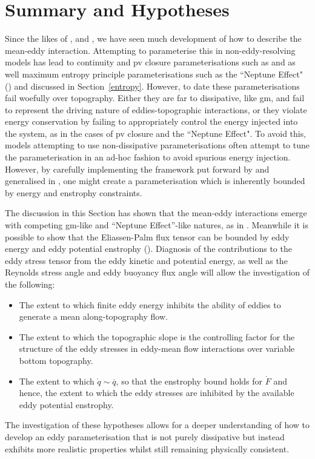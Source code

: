 \documentclass[12pt,a4paper]{report}
\newcommand*\thkmean[1]{\overline{#1}}
\newcommand*\spec[1]{\mathring{#1}}
\begin{document}
                       
                     


\section{Summary and Hypotheses}
\label{hypotheses}

Since the likes of \cite{young1982shear}, \cite{holloway1987systematic} and
\cite{gent1990}, we have seen much development of how to describe the mean-eddy interaction.
Attempting to parameterise this in non-eddy-resolving models has lead to 
continuity and \gls{pv} closure parameterisations such as \cite{gent1990}
and \cite{greatbatch1998exploring} as well maximum entropy principle parameterisations 
such as the ``Neptune Effect" (\cite{holloway1992representing}) and \cite{polyakov2001eddy} discussed in Section~\ref{entropy}.
However, to date these parameterisations fail woefully over topography. Either
they are far to dissipative, like \gls{gm}, and fail to represent the driving nature
of eddies-topographic interactions, or they violate energy conservation
by failing to appropriately control the energy injected into the system, as in the cases
of \gls{pv} closure and the ``Neptune Effect". To avoid this, models attempting to
use non-dissipative parameterisations often attempt to tune the parameterisation in
an ad-hoc fashion to avoid spurious energy injection. However, by carefully implementing
the framework put forward by \cite{marshall2012framework} and generalised in
\cite{maddison2013eliassen}, one might create a parameterisation which is
inherently bounded by energy and enstrophy constraints.

The discussion in this Section has shown that the mean-eddy interactions 
emerge with competing \gls{gm}-like and ``Neptune Effect''-like natures, as in
\cite{adcock2000interactions}. Meanwhile  it is possible to show that
the Eliassen-Palm flux tensor can be bounded by eddy energy and eddy potential enstrophy
(\cite{marshall2012framework}).
Diagnosis of the contributions to the eddy stress tensor from
the eddy kinetic and potential energy, as well as the Reynolds stress angle and eddy buoyancy flux angle will allow the investigation of the following:
\begin{itemize} 
	\item The extent to which finite eddy energy inhibits the ability of eddies to
	generate a mean along-topography flow.
		\item The extent to which the topographic slope is the controlling factor for the structure of the eddy stresses in eddy-mean flow interactions over variable bottom topography.
	    \item The extent to which $\spec{q} \sim \thkmean{q}$, so that the enstrophy bound holds for $\spec{F}$ and hence, the extent to which the eddy stresses are inhibited by the available eddy potential enstrophy.
\end{itemize} 
The investigation of these hypotheses allows for a deeper understanding of
how to develop an eddy parameterisation that is not purely dissipative but instead exhibits
more realistic properties whilst still remaining physically consistent. 
 
\end{document}
